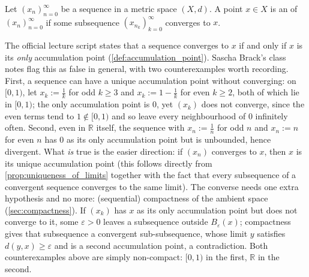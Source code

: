 \begin{definition}
\label{def:accumulation_point}
Let $(x_n)_{n=0}^{\infty}$ be a sequence in a metric space $(X,d)$. A point $x \in X$ is an
  of $(x_n)_{n=0}^{\infty}$ if some
subsequence $(x_{n_k})_{k=0}^{\infty}$ converges to $x$.
\end{definition}

\begin{remark}
The official lecture script states that a sequence converges to $x$ if and only if $x$ is its
\emph{only} accumulation point (\cref{def:accumulation_point}). Sascha Brack's class notes flag
this as false in general, with two counterexamples worth recording. First, a sequence can have a
unique accumulation point without converging: on $[0,1)$, let $x_k := \tfrac1k$ for odd
$k \geq 3$ and $x_k := 1-\tfrac1k$ for even $k \geq 2$, both of which lie in $[0,1)$; the only
accumulation point is $0$, yet $(x_k)$ does not converge, since the even terms tend to
$1 \notin [0,1)$ and so leave every neighbourhood of $0$ infinitely often. Second,
even in $\mathbb{R}$ itself, the sequence with $x_n := \tfrac1n$ for odd $n$ and $x_n := n$ for
even $n$ has $0$ as its only accumulation point but is unbounded, hence divergent. What \emph{is}
true is the easier direction: if $(x_n)$ converges to $x$, then $x$ is its unique accumulation
point (this follows directly from \cref{prop:uniqueness_of_limits} together with the fact that
every subsequence of a convergent sequence converges to the same limit). The converse needs one
extra hypothesis and no more: (sequential) compactness of the ambient space
(\cref{sec:compactness}). If $(x_k)$ has $x$ as its only accumulation point but does not converge
to it, some $\varepsilon>0$ leaves a subsequence outside $B_\varepsilon(x)$; compactness gives
that subsequence a convergent sub-subsequence, whose limit $y$ satisfies
$d(y,x) \geq \varepsilon$ and is a second accumulation point, a contradiction. Both
counterexamples above are simply non-compact: $[0,1)$ in the first, $\mathbb{R}$ in the second.
\end{remark}

